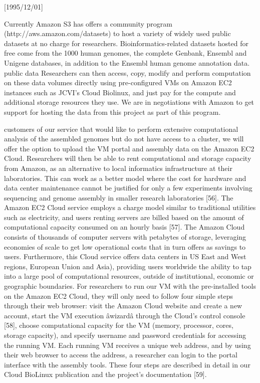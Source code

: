 \NeedsTeXFormat{LaTeX2e}[1995/12/01] \documentclass[10pt]{bmc_article}
\newenvironment{bmcformat}{\begin{raggedright}\baselineskip20pt\sloppy\setboolean{publ}{false}}{\end{raggedright}\baselineskip20pt\sloppy}
\begin{document}
\begin{bmcformat}
Currently Amazon S3 has offers a community program (http://aws.amazon.com/datasets) to host a variety of
widely used public datasets at no charge for  researchers.  Bioinformatics-related datasets hosted for free
come from the 1000 human genomes, the complete Genbank, Ensembl and Unigene databases, in addition to the
Ensembl human genome annotation data. public data Researchers can then access, copy, modify and perform
computation on these data volumes directly using pre-configured VMs on Amazon EC2 instances such as JCVI's
Cloud Biolinux, and just pay for the compute and additional storage resources they use. We are in negotiations
with Amazon to get support for hosting the data from this project as part of this program.

customers of our service that would like to perform extensive computational analysis of the assembled genomes
but do not have access to a cluster, we will offer the option to upload the VM portal and assembly data on the
Amazon EC2 Cloud.  Researchers will then be able to rent computational and storage capacity from Amazon, as an
alternative to local informatics infrastructure at their laboratories.  This can work as a better model where
the cost for hardware and data center maintenance cannot be justified for only a few experiments involving
sequencing and genome assembly in smaller research laboratories [56]. The Amazon EC2 Cloud service employs a
charge model similar to traditional utilities such as electricity, and users renting servers are billed based
on the amount of computational capacity consumed on an hourly basis [57]. The Amazon Cloud consists of
thousands of computer servers with petabytes of storage, leveraging economies of scale to get low operational
costs that in turn offers as savings to users. Furthermore, this Cloud service offers data centers in US East
and West regions, European Union and Asia), providing users worldwide the ability to tap into a large pool of
computational resources, outside of institutional, economic or geographic boundaries. For researchers to run
our VM with the pre-installed tools on the Amazon EC2 Cloud, they will only need to follow four simple steps
through their web browser: visit the Amazon Cloud website and create a new account, start the VM execution
âwizardâ through the Cloud's control console [58], choose computational capacity for the VM (memory,
processor, cores, storage capacity), and specify username and password credentials for accessing the running
VM. Each running VM receives a unique web address, and by using their web browser to access the address, a
researcher can login to the portal interface with the assembly tools. These four steps are described in detail
in our Cloud BioLinux publication and the project's documentation [59].


\end{bmcformat}
\end{document}
